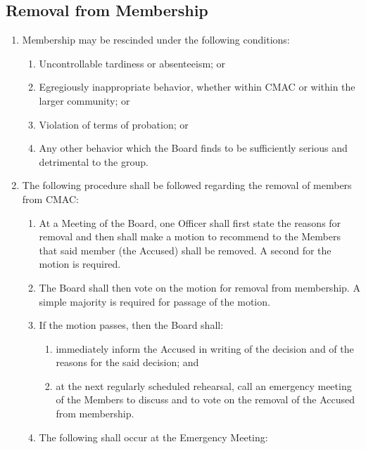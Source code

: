 \documentclass{article}
\begin{document}
\subsection{Removal from Membership}
\begin{enumerate}
\item Membership may be rescinded under the following conditions:

\begin{enumerate}
\item Uncontrollable tardiness or absenteeism; or
\item Egregiously inappropriate behavior, whether within CMAC or within the
  larger community; or
\item Violation of terms of probation; or
\item Any other behavior which the Board finds to be sufficiently serious and
  detrimental to the group.
\end{enumerate}
\item The following procedure shall be followed regarding the removal of
members from CMAC:

\begin{enumerate}
\item At a Meeting of the Board, one Officer shall first state the reasons
for removal and then shall make a motion to recommend to the Members
that said member (the Accused) shall be removed. A second for the
motion is required.
\item The Board shall then vote on the motion for removal from membership.
A simple majority is required for passage of the motion.
\item If the motion passes, then the Board shall:

\begin{enumerate}
\item immediately inform the Accused in writing of the decision and of
the reasons for the said decision; and
\item at the next regularly scheduled rehearsal, call an emergency meeting
of the Members to discuss and to vote on the removal of the Accused
from membership.
\end{enumerate}
\item The following shall occur at the Emergency Meeting:


\end{enumerate}
\end{enumerate}
\end{document}
